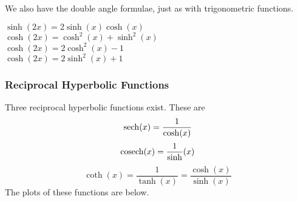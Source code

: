\documentclass[12pt]{report}
\begin{document}
\begin{flushleft}
We also have the double angle formulae, just as with trigonometric functions.

\begin{formulalist}
    \(\sinh(2x) = 2\sinh(x)\cosh(x)\) \\
    \(\cosh(2x) = \cosh^2(x) + \sinh^2(x)\) \\
    \(\cosh(2x) = 2\cosh^2(x) - 1\) \\
    \(\cosh(2x) = 2\sinh^2(x) + 1\) \\
\end{formulalist}

\subsubsection*{Reciprocal Hyperbolic Functions}

Three reciprocal hyperbolic functions exist. These are
\[\operatorname{sech}(x) = \frac{1}{\cosh(x)}\]
\[\operatorname{cosech}(x) = \frac{1}{\sinh}(x)\]
\[\coth(x) = \frac{1}{\tanh(x)} = \frac{\cosh(x)}{\sinh(x)}\]
The plots of these functions are below.

\FloatBarrier
\begin{figure}[h!]
\end{figure}
\FloatBarrier


\end{flushleft}
\end{document}
